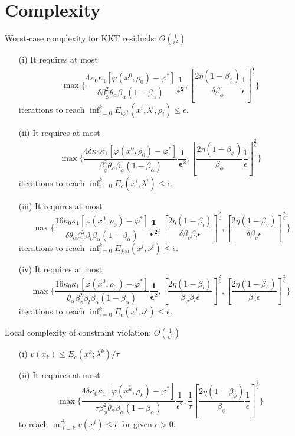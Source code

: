 \documentclass[8pt]{beamer}
\begin{document}
\section{Complexity}

	\begin{frame}{Worst-case complexity for KKT residuals: $O(\frac{1}{\epsilon^2})$}
	\begin{enumerate}
		\item[(i)]  It requires at most 
		\[ \max\Big\{\frac{ 4\kappa_0\kappa_1 [\varphi(x^0,\rho_0) - \varphi^* ]}{\delta \beta_\phi^2   \theta_\alpha \beta_\alpha (1-\beta_\alpha)} \mathbf{\frac{1}{\epsilon^2}},[\frac{2\eta(1-\beta_\phi)}{\delta\beta_\phi } \frac{1}{\epsilon} ]^{\frac{2}{\zeta}}\Big\} \] 
		iterations to reach $\inf_{i=0}^k E_{opt}(x^i, \lambda^i,\rho_i)   \le \epsilon$.
		\item[(ii)] It requires at most
		  \[ \max\Big\{\frac{ 4 \delta \kappa_0\kappa_1 [\varphi(x^0,\rho_0) - \varphi^* ]}{ \beta_\phi^2   \theta_\alpha \beta_\alpha (1-\beta_\alpha)} \mathbf{\frac{1}{\epsilon^2}}, [\frac{2\eta(1-\beta_\phi)}{ \beta_\phi } \frac{1}{\epsilon}]^{\frac{2}{\zeta}}\Big\}  \] 
		iterations to reach $\inf_{i=0}^k E_{c}(x^i, \lambda^i)   \le \epsilon$.
		\item[(iii)]  It requires at most 
		\[ \max\Big\{\frac{16 \kappa_0\kappa_1[\varphi(x^0,\rho_0) - \varphi^* ]}{\delta \theta_\alpha \beta_v^2  \beta_l \beta_\alpha(1-\beta_\alpha)} \mathbf{\frac{1}{\epsilon^2}}, \left[ \frac{2\eta(1-\beta_l)}{\delta \beta_v \beta_l \epsilon}\right]^{\frac{2}{\zeta}}, \left[\frac{2\eta(1-\beta_v)}{\delta\beta_v \epsilon} \right] ^{\frac{2}{\zeta}} \Big\}\] 
		iterations to reach $\inf_{i=0}^k E_{fea}(x^i, \nu^i)   \le \epsilon$.
		\item[(iv)]  It requires at most
		\[ \max\Big\{\frac{16 \kappa_0\kappa_1[\varphi(x^0,\rho_0) - \varphi^* ]}{ \theta_\alpha \beta_\phi^2  \beta_l \beta_\alpha(1-\beta_\alpha)} \mathbf{\frac{1}{\epsilon^2}}, \left[ \frac{2\eta(1-\beta_l)}{ \beta_\phi \beta_l \epsilon}\right]^{\frac{2}{\zeta}},  \left[\frac{2\eta(1-\beta_v)}{ \beta_v\epsilon} \right] ^{\frac{2}{\zeta}} \Big\}\] 
		iterations to reach $\inf_{i=0}^k E_{c}(x^i, \nu^i)  \le \epsilon$.
	\end{enumerate}\end{frame}
	
	\begin{frame}{Local complexity of constraint violation: $O(\frac{1}{\epsilon^2})$}
	\begin{enumerate}
		\item[(i)]  
			$ v(x_k) \le E_c(x^k; \lambda^k ) / \tau$
		\vfill
		\item[(ii)] It requires at most
			\[ \max\Big\{ \frac{ 4 \delta \kappa_0\kappa_1 [\varphi(x^{\bar{k}},\rho_{\bar{k}}) - \varphi^* ]}{ \tau \beta_\phi^2   \theta_\alpha \beta_\alpha (1-\beta_\alpha)} \frac{1}{\epsilon^2}, \frac{1}{\tau}[\frac{2\eta(1-\beta_\phi)}{ \beta_\phi } \frac{1}{\epsilon}]^{\frac{2}{\zeta}} \Big\} \] 
			to reach $\inf_{i = \bar{k}}^kv(x^i)\le \epsilon$ for given $\epsilon > 0$. 
	\end{enumerate}\end{frame}
\end{document}
